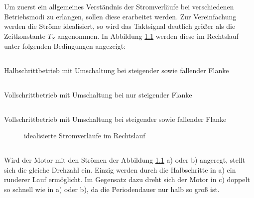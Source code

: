 \chapter{}\label{ch:aufg1}
Um zuerst ein allgemeines Verständnis der Stromverläufe bei verschiedenen Betriebsmodi zu erlangen, sollen diese erarbeitet werden. Zur Vereinfachung werden die Ströme idealisiert, so wird das Taktsignal deutlich größer als die Zeitkonstante $ T_{S} $ angenommen. In Abbildung \ref{fig:1:strom} werden diese im Rechtslauf unter folgenden Bedingungen angezeigt:
\section{}\label{sec:1a}
Halbschrittbetrieb mit Umschaltung bei steigender sowie fallender Flanke
\section{}\label{sec:1b}
Vollschrittbetrieb mit Umschaltung bei nur steigender Flanke
\section{}\label{sec:1c}
Vollschrittbetrieb mit Umschaltung bei steigender sowie fallender Flanke

\begin{figure}[h]
	\centering
	
	\caption{idealisierte Stromverläufe im Rechtslauf}
	\label{fig:1:strom}
\end{figure}

\section{}\label{sec:1d}
Wird der Motor mit den Strömen der Abbildung \ref{fig:1:strom} a) oder b) angeregt, stellt sich die gleiche Drehzahl ein. Einzig werden durch die Halbschritte in a) ein runderer Lauf ermöglicht. Im Gegensatz dazu dreht sich der Motor in c) doppelt so schnell wie in a) oder b), da die Periodendauer nur halb so groß ist.